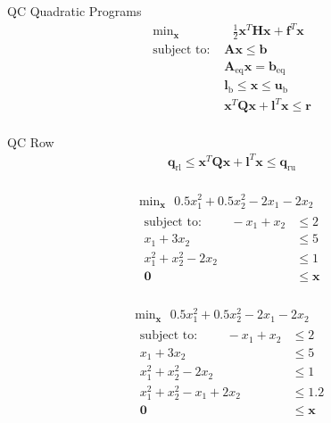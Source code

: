 \documentclass{article}
\begin{document}
QC Quadratic Programs
\begin{align*}
    \text{min}_{\mathbf{x}}& \text{ } \frac{1}{2}\mathbf{x}^T \mathbf{H} \mathbf{x} + \mathbf{f}^T \mathbf{x} \\
    \mbox{subject to: }& \mathbf{A}\mathbf{x} \le \mathbf{b}\\
                       & \mathbf{A}_\text{eq}\mathbf{x} = \mathbf{b}_\text{eq}\\
                       & \mathbf{l}_{\text{b}} \le \mathbf{x} \le \mathbf{u}_{\text{b}}\\
                       & \mathbf{x}^T \mathbf{Q} \mathbf{x} + \mathbf{l}^T \mathbf{x} \le \mathbf{r}\\
\end{align*}

QC Row
\begin{align*}
\mathbf{q}_\text{rl} \le \mathbf{x}^T \mathbf{Q} \mathbf{x} + \mathbf{l}^T \mathbf{x} \le \mathbf{q}_\text{ru}\\
\end{align*}

\begin{align*}
    \text{min}_{\mathbf{x}} \text{ } 0.5x_1^2 + 0.5x_2^2 - 2x_1 - 2x_2\\
    \begin{aligned}
    \mbox{subject to: } \qquad -x_1 + x_2 &\le 2\\
                        x_1 + 3x_2 &\le 5\\
                        x_1^2 + x_2^2 - 2x_2 &\le 1\\
                        \mathbf{0} &\le \mathbf{x}\\
    \end{aligned}
\end{align*}

\begin{align*}
    \text{min}_{\mathbf{x}} \text{ } 0.5x_1^2 + 0.5x_2^2 - 2x_1 - 2x_2\\
    \begin{aligned}
    \mbox{subject to: } \qquad -x_1 + x_2 &\le 2\\
                        x_1 + 3x_2 &\le 5\\
                        x_1^2 + x_2^2 - 2x_2 &\le 1\\
                        x_1^2 + x_2^2 - x_1 + 2x_2 &\le 1.2\\
                        \mathbf{0} &\le \mathbf{x}\\
    \end{aligned}
\end{align*}
\end{document}
